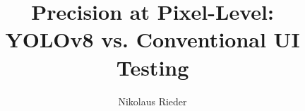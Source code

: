 \documentclass[Bachelor,BIC,english,fhCitStyle,IEEE]{BASE/twbook} %
\title{Precision at Pixel-Level:\\YOLOv8 vs. Conventional UI Testing}
\author{Nikolaus Rieder}
\begin{document}
\maketitle

\end{document}
